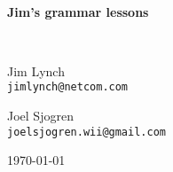 \begin{titlepage}
\begin{center}




\vspace*{6cm}
\HRule \\[0.4cm]
{ \huge \bfseries Jim's grammar lessons \\[0.4cm] }

\HRule \\[1.5cm]

\begin{minipage}{0.4\textwidth}
\begin{flushleft} \large
Jim Lynch\\
\texttt{jimlynch@netcom.com}
\end{flushleft}
\end{minipage}
\begin{minipage}{0.4\textwidth}
\begin{flushright} \large
Joel Sjogren\\
\texttt{joelsjogren.wii@gmail.com}
\end{flushright}
\end{minipage}

\vspace{1cm}
\begin{center}
\end{center}

\vfill

{\large \today}

\end{center}
\end{titlepage}

